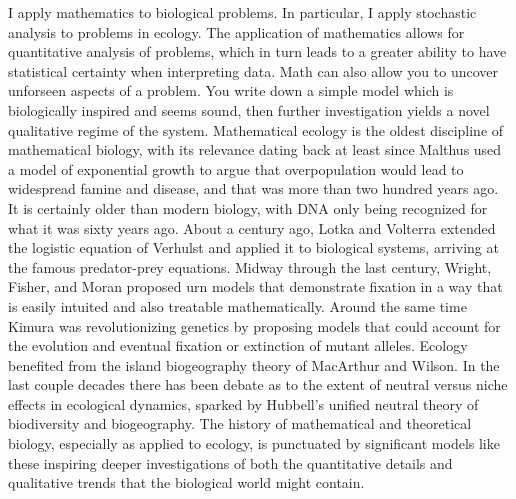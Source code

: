 I apply mathematics to biological problems. In particular, I apply stochastic analysis to problems in ecology. 
The application of mathematics allows for quantitative analysis of problems, which in turn leads to a greater ability to have statistical certainty when interpreting data. 
Math can also allow you to uncover unforseen aspects of a problem. 
You write down a simple model which is biologically inspired and seems sound, then further investigation yields a novel qualitative regime of the system. 
Mathematical ecology is the oldest discipline of mathematical biology, with its relevance dating back at least since Malthus used a model of exponential growth to argue that overpopulation would lead to widespread famine and disease, and that was more than two hundred years ago. 
It is certainly older than modern biology, with DNA only being recognized for what it was sixty years ago. 
About a century ago, Lotka and Volterra extended the logistic equation of Verhulst and applied it to biological systems, arriving at the famous predator-prey equations. 
Midway through the last century, Wright, Fisher, and Moran proposed urn models that demonstrate fixation in a way that is easily intuited and also treatable mathematically. 
Around the same time Kimura was revolutionizing genetics by proposing models that could account for the evolution and eventual fixation or extinction of mutant alleles. 
Ecology benefited from the island biogeography theory of MacArthur and Wilson. 
In the last couple decades there has been debate as to the extent of neutral versus niche effects in ecological dynamics, sparked by Hubbell’s unified neutral theory of biodiversity and biogeography. 
The history of mathematical and theoretical biology, especially as applied to ecology, is punctuated by significant models like these inspiring deeper investigations of both the quantitative details and qualitative trends that the biological world might contain. 

